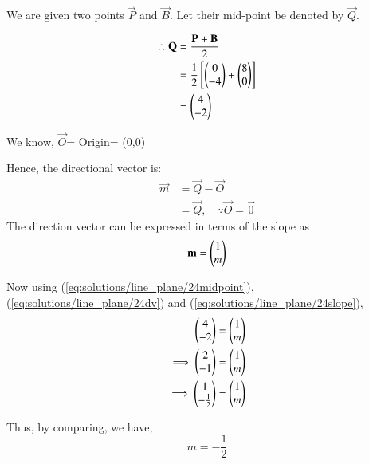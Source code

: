 We are given two points $\vec{P}$ and $\vec{B}$. Let their mid-point be denoted by $\vec{Q}$.

\begin{align}
    \therefore
    \mathbf{Q} &=\frac{\mathbf{P}+\mathbf{B}}{2}\\
    &=\frac{1}{2}{}\left[\begin{pmatrix}0\\-4\end{pmatrix}
    +
    \begin{pmatrix}8\\0\end{pmatrix}\right]\\
    &=\label{eq:solutions/line_plane/24midpoint}\begin{pmatrix}4\\-2\end{pmatrix}
\end{align}

We know, $\vec{O}$= Origin= (0,0)

Hence, the directional vector is:
\begin{align}
    \vec{m} &= \vec{Q}-\vec{O}\\
    &=\label{eq:solutions/line_plane/24dv} \vec{Q}, \quad \because \vec{O} = \vec{0}
\end{align}
The direction vector can be expressed in terms of the slope as
\begin{equation}
    \label{eq:solutions/line_plane/24slope}\mathbf{m} = \begin{pmatrix}1 \\ m\end{pmatrix}
\end{equation}

Now using (\ref{eq:solutions/line_plane/24midpoint}), (\ref{eq:solutions/line_plane/24dv}) and (\ref{eq:solutions/line_plane/24slope}),
\begin{align}
    \begin{pmatrix}4\\-2\end{pmatrix}=\begin{pmatrix}1\\m\end{pmatrix}\\
    \implies\begin{pmatrix}2\\-1\end{pmatrix}=\begin{pmatrix}1\\m\end{pmatrix}\\
    \implies\begin{pmatrix}1\\-\frac{1}{2}\end{pmatrix}=\begin{pmatrix}1\\m\end{pmatrix}
\end{align}

Thus, by comparing, we have,
\begin{equation}
    m=-\frac{1}{2}
\end{equation}

